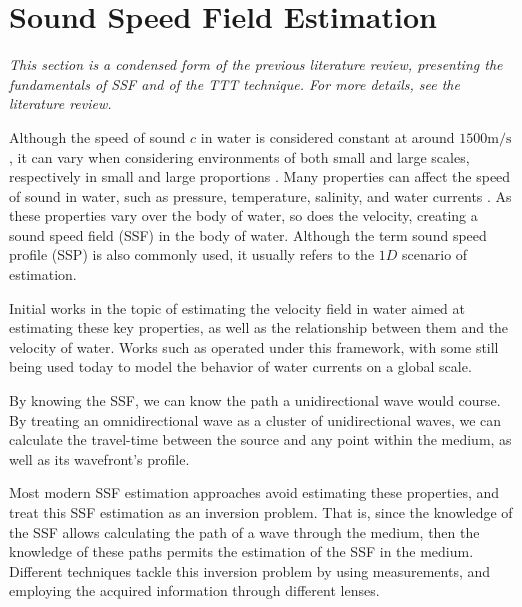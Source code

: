 \section{Sound Speed Field Estimation}

\textit{\small This section is a condensed form of the previous literature review, presenting the fundamentals of SSF and of the TTT technique. For more details, see the literature review.}

Although the speed of sound $c$ in water is considered constant at around $1500 \si{\meter}/\si{\second}$, it can vary when considering environments of both small and large scales, respectively in small and large proportions \cite{kieffer_sound_1977,trusler_determination_2017,li_sound_2015,pinson_sound_2010}. Many properties can affect the speed of sound in water, such as pressure, temperature, salinity, and water currents \cite{wilson_speed_1959,medwin_fundamentals_1999,mcdougall_getting_2011,delgrosso_new_1974}. As these properties vary over the body of water, so does the velocity, creating a sound speed field (SSF) in the body of water. Although the term sound speed profile \cite{li_acoustic_2019,li_sound_2015,pinson_sound_2010} (SSP) is also commonly used, it usually refers to the $1D$ scenario of estimation.

Initial works in the topic of estimating the velocity field in water aimed at estimating these key properties, as well as the relationship between them and the velocity of water. Works such as \cite{wilson_speed_1959,medwin_fundamentals_1999,mcdougall_getting_2011,delgrosso_new_1974,chen_speed_1977,wong_speed_1995,roquet_accurate_2015} operated under this framework, with some still being used today to model the behavior of water currents on a global scale.

By knowing the SSF, we can know the path a unidirectional wave would course. By treating an omnidirectional wave as a cluster of unidirectional waves, we can calculate the travel-time between the source and any point within the medium, as well as its wavefront's profile.

Most modern SSF estimation approaches avoid estimating these properties, and treat this SSF estimation as an inversion problem. That is, since the knowledge of the SSF allows calculating the path of a wave through the medium, then the knowledge of these paths permits the estimation of the SSF in the medium. Different techniques tackle this inversion problem by using measurements, and employing the acquired information through different lenses.

